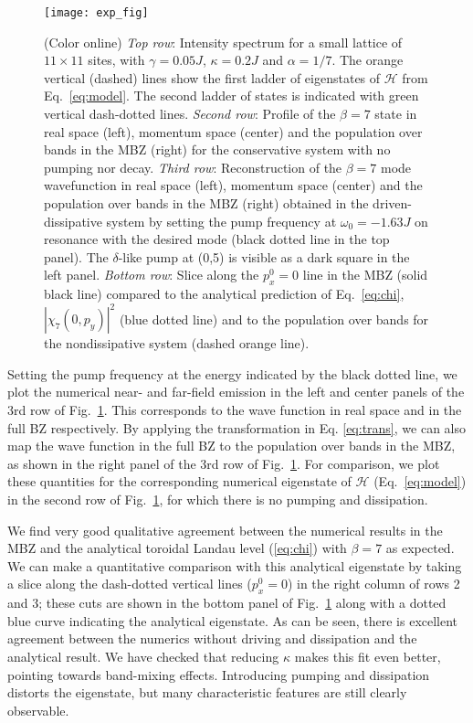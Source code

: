 \documentclass[twocolumn, 10pt, aps, superscriptaddress, floatfix, showpacs, pra, citeautoscript]{revtex4-1}
\begin{document}
\begin{figure}[tb]
  \centering
  \texttt{[image: exp\_fig]} %
  \caption{(Color online) \emph{Top row}: Intensity spectrum for a small lattice of $11 \times 11$ sites, with
    $\gamma = 0.05 J$, $\kappa = 0.2 J$ and $\alpha=1/7$. The orange vertical (dashed) lines
    show the first ladder of eigenstates of $\mathcal{H}$ from Eq.~\eqref{eq:model}. The second ladder of states is indicated with green vertical dash-dotted lines.
  \emph{Second row}: Profile of the $\beta=7$ state in real space
    (left), momentum space (center) and the population over bands in the MBZ (right) for the conservative system with no pumping nor decay.
    \emph{Third row}: Reconstruction of the $\beta=7$ mode wavefunction in real space (left), momentum space (center) and the population over bands in the MBZ (right) obtained in the driven-dissipative system by setting the pump frequency at $\omega_0 = -1.63 J$ on resonance with the desired mode (black dotted line in the top panel).
The $\delta$-like pump at (0,5) is visible as a dark square in the left panel.
    \emph{Bottom row}: Slice along the $p_x^0 = 0$ line in the MBZ
    (solid black line) compared to the analytical prediction of
    Eq.~\eqref{eq:chi}, $|\chi_7(0,p_y)|^2$ (blue dotted line) and to the population over bands for the nondissipative system (dashed orange line).}
  \label{fig:exp}
\end{figure}


Setting the pump frequency at the energy indicated by the black dotted
line, we plot the numerical near- and far-field emission in the left and center panels of the 3rd row of Fig.~\ref{fig:exp}. This corresponds to 
the wave function in real space and in the full
BZ respectively. By applying the transformation in Eq. \ref{eq:trans}, we can also map the wave function in the full BZ to the population over bands in the MBZ, as shown in the right panel of the 3rd row of Fig.~\ref{fig:exp}. For comparison, we plot these
quantities for the corresponding numerical eigenstate of $\mathcal{H}$ (Eq.~\eqref{eq:model})
in the second row of Fig.~\ref{fig:exp}, for which there is no pumping and dissipation. 

We find very good qualitative agreement between the numerical results in the MBZ and the analytical toroidal Landau level (\ref{eq:chi}) with $\beta=7$ as expected. We can make a quantitative comparison with this analytical eigenstate by taking
a slice along the dash-dotted vertical lines ($p_x^0 = 0$) in the
right column of rows 2 and 3; these cuts are shown in the bottom panel of Fig.~\ref{fig:exp} along with a dotted blue curve indicating the analytical eigenstate. As can be seen, there is excellent agreement between the numerics without driving and dissipation and the analytical result. We have checked that reducing $\kappa$ makes this fit even better, pointing towards band-mixing effects. Introducing pumping and dissipation distorts the eigenstate, but many characteristic features are still clearly observable. 
\end{document}
